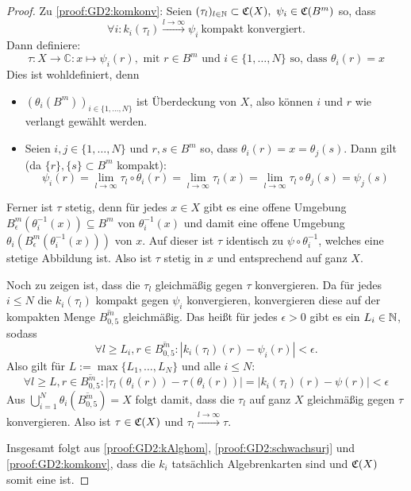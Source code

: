 \begin{proof}
Zu \ref{proof:GD2:komkonv}: Seien $ (\tau_l)_{l\in \mathbb{N}} \subset \mathfrak{C}(X), ~\psi_i \in \mathfrak{C}(B^m)$ so, dass
\[\forall i: k_i(\tau_l) \overset{l \to \infty}{\longrightarrow} \psi_i ~\text{kompakt konvergiert.}\]
Dann definiere:
\[\tau: X \to \mathbb{C}: x \mapsto \psi_i(r), \text{ mit } r\in B^m \text{ und } i\in \{1,\dots,N\} \text{ so, dass } \theta_i(r) = x \]
Dies ist wohldefiniert, denn
\begin{itemize}
  \item $(\theta_i(B^m))_{i\in\{1,\dots,N\}}$ ist Überdeckung von $X$, also können $i$ und $r$ wie verlangt gewählt werden.
  \item Seien $i,j \in \{1,\dots,N\}$ und $r,s \in B^m$ so, dass $\theta_i(r) = x = \theta_j(s)$. Dann gilt (da $\{r\}, \{s\} \subset B^m$ kompakt):
  \[\psi_i(r) = \underset{l \to \infty}{\lim} \tau_l\circ\theta_i(r) = \underset{l \to \infty}{\lim} \tau_l (x) = \underset{l \to \infty}{\lim} \tau_l\circ\theta_j(s) = \psi_j(s)\]
\end{itemize}

Ferner ist $\tau$ stetig, denn für jedes $x \in X$ gibt es eine offene Umgebung $B_\epsilon^m(\theta_i^{-1}(x)) \subseteq B^m$ von $\theta_i^{-1}(x)$ und damit eine offene Umgebung $\theta_i(B_\epsilon^m(\theta_i^{-1}(x)))$ von $x$. Auf dieser ist $\tau$ identisch zu $\psi \circ \theta_i^{-1}$, welches eine stetige Abbildung ist. Also ist $\tau$ stetig in $x$ und entsprechend auf ganz $X$.

Noch zu zeigen ist, dass die $\tau_l$ gleichmäßig gegen $\tau$ konvergieren. Da für jedes $i \leq N$ die $k_i(\tau_l)$ kompakt gegen $\psi_i$ konvergieren, konvergieren diese auf der kompakten Menge $\overline{B_{0,5}^m}$ gleichmäßig. Das heißt für jedes $\epsilon > 0$ gibt es ein $L_i \in \mathbb{N}$, sodass
	\[\forall l \geq L_i, r \in \overline{B_{0,5}^m}: \left| k_i(\tau_l)(r) - \psi_i(r) \right| < \epsilon.\]
Also gilt für $L := \max\{L_1, \dots, L_N\}$ und alle $i \leq N$:
	\[\forall l \geq L, r \in \overline{B_{0,5}^m}: \left|\tau_l(\theta_i(r)) - \tau(\theta_i(r))\right| = \left|k_i(\tau_l)(r) - \psi(r)\right|  < \epsilon\]
Aus $\bigcup_{i=1}^N\theta_i(\overline{B_{0,5}^m}) = X$ folgt damit, dass die $\tau_l$ auf ganz $X$ gleichmäßig gegen $\tau$ konvergieren. Also ist $\tau \in \mathfrak{C}(X)$ und $\tau_l \overset{l \to \infty}{\longrightarrow} \tau$.

Insgesamt folgt aus \ref{proof:GD2:kAlghom}, \ref{proof:GD2:schwachsurj} und \ref{proof:GD2:komkonv}, dass die $k_i$ tatsächlich Algebrenkarten sind und $\mathfrak{C}(X)$ somit eine \CAlgMan{} ist.



\end{proof}
